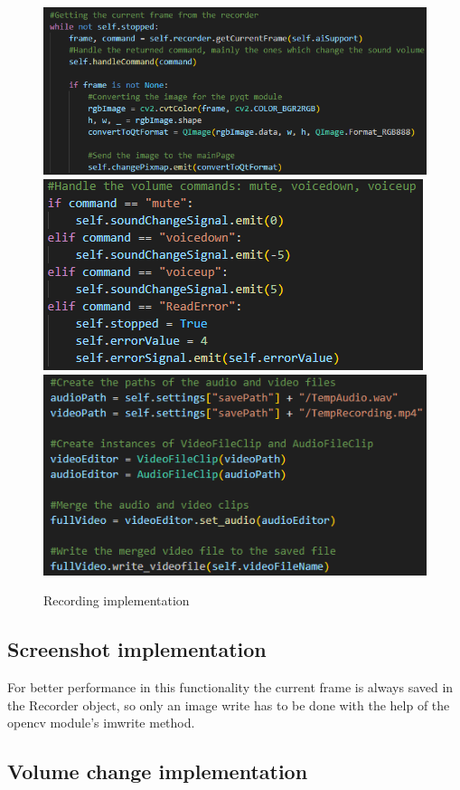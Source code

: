 \begin{figure}
    \centering
    \includegraphics[width=0.4\linewidth]{figures/UIRecorderWhile.png}
    \includegraphics[width=0.4\linewidth]{figures/CommandHandling.png}
    \includegraphics[width=0.4\linewidth]{figures/Merging.png}
    \caption{Recording implementation}
    \label{fig:RecordingCode}
\end{figure}

\subsection{Screenshot implementation}
\label{sec:designsec5subsec2}

\par For better performance in this functionality the current frame is always saved in the Recorder object, so only an image write has to be done with the help of the opencv module's imwrite method. 

\subsection{Volume change implementation}
\label{sec:designsec5subsec3}

